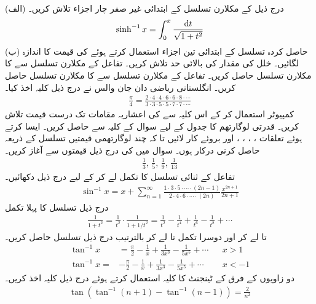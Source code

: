 (الف) درج ذیل کے مکلارن تسلسل کے ابتدائی غیر صفر چار اجزاء تلاش کریں۔
\begin{align*}
\sinh^{-1}x=\int_0^x\frac{\dif t}{\sqrt{1+t^2}}
\end{align*}
(ب) حاصل کردہ تسلسل کے ابتدائی تین اجزاء استعمال کرتے ہوئے  کی قیمت کا اندازہ لگائیں۔ خلل کی مقدار کی بالائی حد تلاش کریں۔
تفاعل  کے مکلارن تسلسل سے  کا مکلارن تسلسل حاصل کریں۔
تفاعل  کے مکلارن تسلسل سے  کا مکلارن تسلسل حاصل کریں۔
انگلستانی ریاضی دان جان والس نے درج ذیل کلیہ اخذ کیا۔
\begin{align*}
\frac{\pi}{4}=\frac{2\cdot 4\cdot 4\cdot 6\cdot 6\cdot 8\cdot\cdots}{3\cdot 3\cdot 5\cdot 5\cdot 7\cdot 7\cdot \cdots}
\end{align*} 
کمپیوٹر استعمال کر کے اس کلیہ سے  کی   اعشاریہ مقامات تک   درست قیمت    تلاش کریں۔
قدرتی لوگارتھم   کا جدول  کے لیے سوال  کے کلیہ سے حاصل کریں۔ ایسا کرتے ہوئے  تعلقات ، ، ، ،  اور   بروئے کار لائیں تا کہ چند لوگارتھمی قیمتیں تسلسل کے ذریعہ  حاصل کرنی  درکار ہوں۔ سوال  میں  کی   درج ذیل قیمتوں سے آغاز  کریں۔
\begin{align*}
\frac{1}{3},\,\frac{1}{5},\,\frac{1}{9},\,\frac{1}{13}
\end{align*} 
تفاعل  کے ثنائی تسلسل کا تکمل لے کر  کے لیے درج ذیل دکھائیں۔
\begin{align*}
\sin^{-1}x=x+\sum_{n=1}^{\infty}\frac{1\cdot3\cdot 5\cdot\cdots\cdot (2n-1)}{2\cdot4\cdot6\cdot\cdots\cdot(2n)}\frac{x^{2n+1}}{2n+1}
\end{align*}
درج ذیل تسلسل کا پہلا تکمل  
\begin{align*}
\frac{1}{1+t^2}=\frac{1}{t^2}\cdot\frac{1}{1+1/t^2}=\frac{1}{t^2}-\frac{1}{t^4}+\frac{1}{t^6}-\frac{1}{t^8}+\cdots
\end{align*}
 تا  لے کر اور دوسرا تکمل  تا  لے کر بالترتیب درج ذیل تسلسل حاصل کریں۔
\begin{align*}
\tan^{-1}x&=\frac{\pi}{2}-\frac{1}{x}+\frac{1}{3x^3}-\frac{1}{5x^5}+\cdots&&x>1\\
\tan^{-1}x=&-\frac{\pi}{2}-\frac{1}{x}+\frac{1}{3x^3}-\frac{1}{5x^5}+\cdots&&x<-1
\end{align*}
دو زاویوں کے فرق کے ٹینجنٹ کا کلیہ استعمال کرتے ہوئے درج ذیل کلیہ اخذ کریں۔
\begin{align*}
\tan(\tan^{-1}(n+1)-\tan^{-1}(n-1))=\frac{2}{n^2}
\end{align*}


